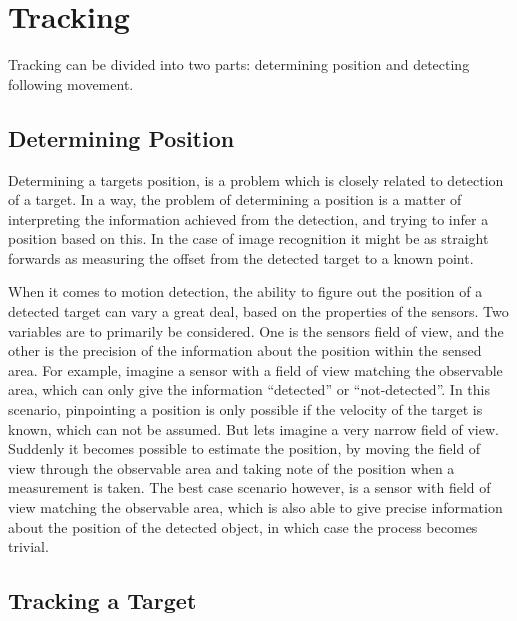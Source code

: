 \section{Tracking}\label{predesign:tracking}
Tracking can be divided into two parts: determining position and detecting following movement.

\subsection{Determining Position}

Determining a targets position, is a problem which is closely related to detection of a target. In a way, the problem of determining a position is a matter of interpreting the information achieved from the detection, and trying to infer a position based on this. In the case of image recognition it might be as straight forwards as measuring the offset from the detected target to a known point.

When it comes to motion detection, the ability to figure out the position of a detected target can vary a great deal, based on the properties of the sensors. Two variables are to primarily be considered. One is the sensors field of view, and the other is the precision of the information about the position within the sensed area. For example, imagine a sensor with a field of view matching the observable area, which can only give the information \enquote{detected} or \enquote{not-detected}. In this scenario, pinpointing a position is only possible if the velocity of the target is known, which can not be assumed. But lets imagine a very narrow field of view. Suddenly it becomes possible to estimate the position, by moving the field of view through the observable area and taking note of the position when a measurement is taken. The best case scenario however, is a sensor with field of view matching the observable area, which is also able to give precise information about the position of the detected object, in which case the process becomes trivial.

\subsection{Tracking a Target}

